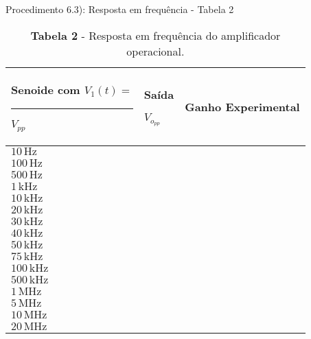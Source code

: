 \pagebreak

Procedimento 6.3): Resposta em frequência - Tabela 2


\begin{table}[H]
\centering
\begin{tabular}{|>{\centering}p{5cm}|>{\centering}p{2cm}|>{\centering}p{2cm}|}
\hline 
Senoide com $V_{1}(t)=$\enspace\rule{1.5cm}{.4pt}\enspace $V_{pp}$ & Saída 

$V_{o_{pp}}$ & Ganho Experimental\tabularnewline
\hline 
$10\,\textrm{Hz}$ &  & \tabularnewline
\hline 
$100\,\textrm{Hz}$ &  & \tabularnewline
\hline 
$500\,\textrm{Hz}$ &  & \tabularnewline
\hline 
$1\,\textrm{kHz}$ &  & \tabularnewline
\hline 
$10\,\textrm{kHz}$ &  & \tabularnewline
\hline 
$20\,\textrm{kHz}$ &  & \tabularnewline
\hline 
$30\,\textrm{kHz}$ &  & \tabularnewline
\hline 
$40\,\textrm{kHz}$ &  & \tabularnewline
\hline 
$50\,\textrm{kHz}$ &  & \tabularnewline
\hline 
$75\,\textrm{kHz}$ &  & \tabularnewline
\hline 
$100\,\textrm{kHz}$ &  & \tabularnewline
\hline 
$500\,\textrm{kHz}$ &  & \tabularnewline
\hline 
$1\,\textrm{MHz}$ &  & \tabularnewline
\hline 
$5\,\textrm{MHz}$ &  & \tabularnewline
\hline 
$10\,\textrm{MHz}$ &  & \tabularnewline
\hline 
$20\,\textrm{MHz}$ &  & \tabularnewline
\hline 
\end{tabular}

\caption{\textbf{Tabela 2} - Resposta em frequência do amplificador operacional.}
\end{table}